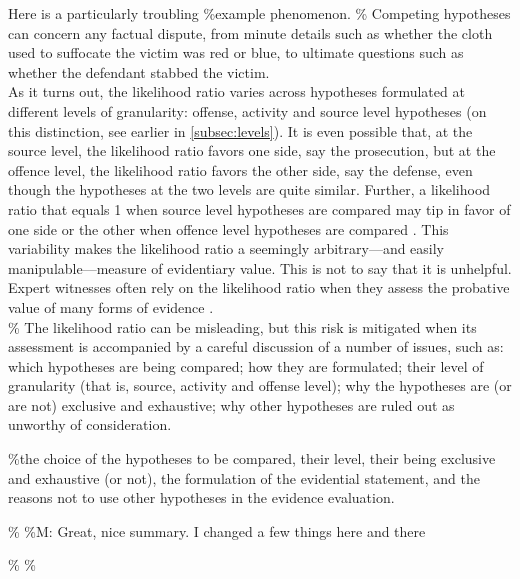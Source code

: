 \documentclass[10pt,dvipsnames,enabledeprecatedfontcommands]{scrartcl}
\begin{document}
Here is a particularly troubling \%example phenomenon.
\% Competing
hypotheses can concern any factual dispute, from minute details such as
whether the cloth used to suffocate the victim was red or blue, to
ultimate questions such as whether the defendant stabbed the victim.\\
As it turns out, the likelihood ratio varies across hypotheses
formulated at different levels of granularity: offense, activity and
source level hypotheses (on this distinction, see earlier in
\ref{subsec:levels}). It is even possible that, at the source level, the
likelihood ratio favors one side, say the prosecution, but at the
offence level, the likelihood ratio favors the other side, say the
defense, even though the hypotheses at the two levels are quite similar.
Further, a likelihood ratio that equals 1 when source level hypotheses
are compared may tip in favor of one side or the other when offence
level hypotheses are compared \citep{fenton2014WhenNeutralEvidence}.
This variability makes the likelihood ratio a seemingly arbitrary---and
easily manipulable---measure of evidentiary value. This is not to say
that it is unhelpful. Expert witnesses often rely on the likelihood
ratio when they assess the probative value of many forms of evidence
\citep{enfs2015}.\\
\% The likelihood ratio can be misleading, but this risk is mitigated
when its assessment is accompanied by a careful discussion of a number
of issues, such as: which hypotheses are being compared; how they are
formulated; their level of granularity (that is, source, activity and
offense level); why the hypotheses are (or are not) exclusive and
exhaustive; why other hypotheses are ruled out as unworthy of
consideration.

\%the choice of the hypotheses to be compared, their level, their being
exclusive and exhaustive (or not), the formulation of the evidential
statement, and the reasons not to use other hypotheses in the evidence
evaluation.

\% \%M: Great,
nice summary. I changed a few things here and there

\% \%
\end{document}
